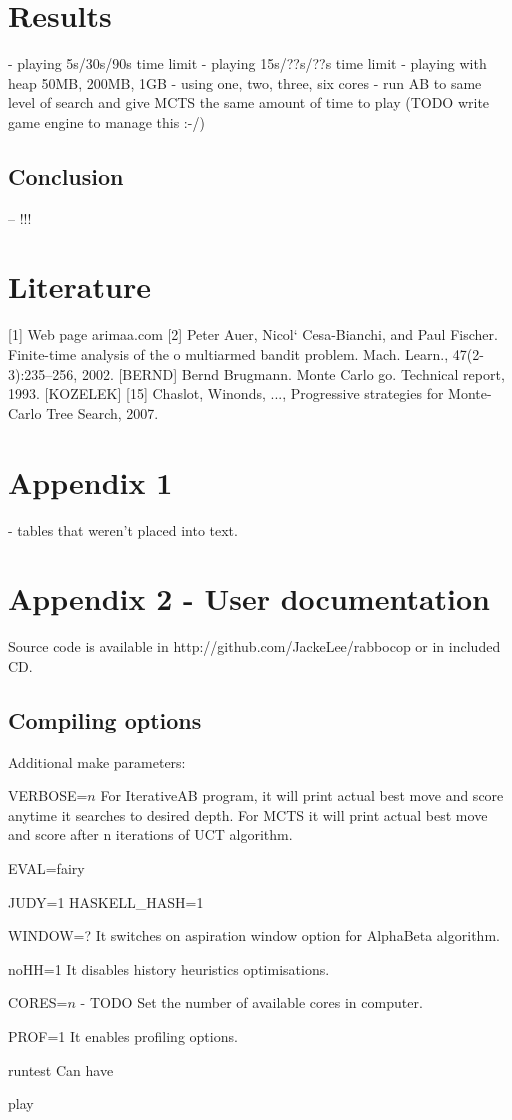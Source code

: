 \documentclass[12pt,titlepage,fleqn]{report}
\begin{document}
\chapter{Results}
- playing 5s/30s/90s time limit
- playing 15s/??s/??s time limit
- playing with heap 50MB, 200MB, 1GB
- using one, two, three, six cores
- run AB to same level of search and give MCTS the same amount of time to play
  (TODO write game engine to manage this :-/)


\section{Conclusion}
-- !!!

\chapter{Literature}
[1] Web page arimaa.com
[2] Peter Auer, Nicol` Cesa-Bianchi, and Paul Fischer. Finite-time analysis of
    the o multiarmed bandit problem. Mach. Learn., 47(2-3):235–256, 2002.
[BERND] Bernd Brugmann. Monte Carlo go. Technical report, 1993.
[KOZELEK]
[15] Chaslot, Winonds, ..., Progressive strategies for Monte-Carlo Tree Search, 2007.


\chapter{Appendix 1}
- tables that weren't placed into text.

\chapter{Appendix 2 - User documentation}
Source code is available in http://github.com/JackeLee/rabbocop or in included CD.

\section{Compiling options}
Additional make parameters:

VERBOSE=$n$
  For IterativeAB program, it will print actual best move and score anytime
  it searches to desired depth.
  For MCTS it will print actual best move and score after n iterations of
  UCT algorithm.

EVAL=fairy

JUDY=1
HASKELL\_HASH=1

WINDOW=?
	It switches on aspiration window option for AlphaBeta algorithm.

noHH=1
	It disables history heuristics optimisations.

CORES=$n$ - TODO
	Set the number of available cores in computer.

PROF=1
	It enables profiling options.

runtest
	Can have

play
\end{document}
